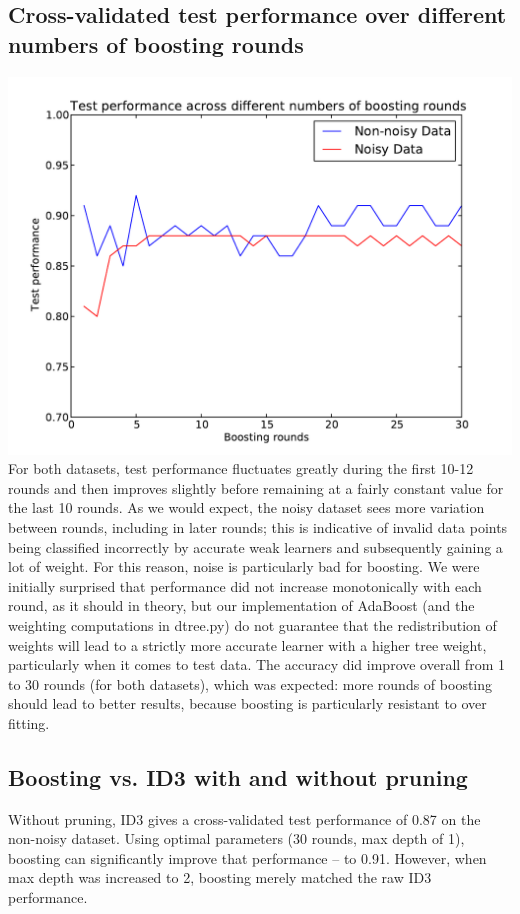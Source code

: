 \documentclass[11pt]{article}
\begin{document}
\subsection{Cross-validated test performance over different numbers of boosting rounds}
\includegraphics[scale=0.8]{graph3b}
For both datasets, test performance fluctuates greatly during the first 10-12 rounds and then improves slightly before remaining at a fairly constant value for the last 10 rounds. As we would expect, the noisy dataset sees more variation between rounds, including in later rounds; this is indicative of invalid data points being classified incorrectly by accurate weak learners and subsequently gaining a lot of weight. For this reason, noise is particularly bad for boosting. We were initially surprised that performance did not increase monotonically with each round, as it should in theory, but our implementation of AdaBoost (and the weighting computations in dtree.py) do not guarantee that the redistribution of weights will lead to a strictly more accurate learner with a higher tree weight, particularly when it comes to test data. The accuracy did improve overall from 1 to 30 rounds (for both datasets), which was expected: more rounds of boosting should lead to better results, because boosting is particularly resistant to over fitting.

\subsection{Boosting vs. ID3 with and without pruning}
Without pruning, ID3 gives a cross-validated test performance of 0.87 on the non-noisy dataset. Using optimal parameters (30 rounds, max depth of 1), boosting can significantly improve that performance -- to 0.91. However, when max depth was increased to 2, boosting merely matched the raw ID3 performance. 
\end{document}
